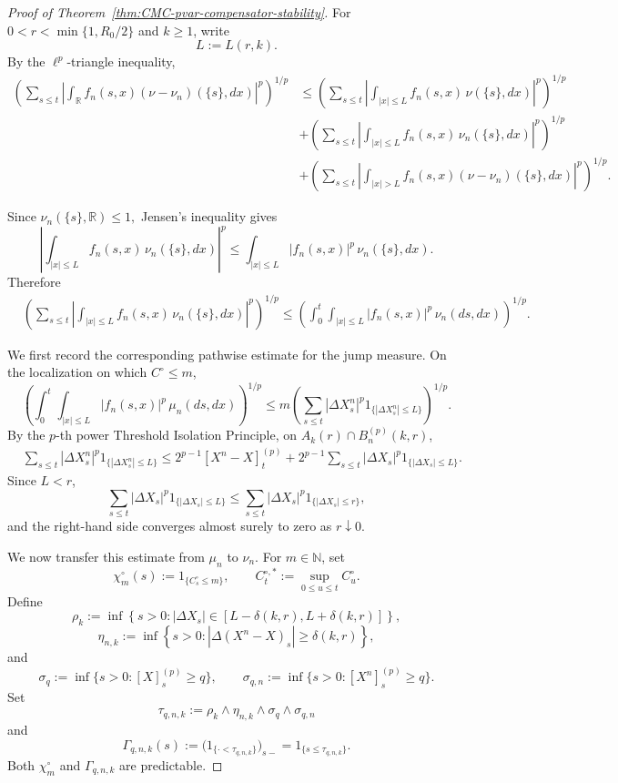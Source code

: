 \documentclass[a4paper,10pt]{article}
\begin{document}
\begin{proof}[Proof of Theorem~\ref{thm:CMC-pvar-compensator-stability}]
For \(0<r<\min\{1,R_0/2\}\) and \(k\ge1\), write
\[
        L:=L(r,k).
\]
By the \(\ell^p\)-triangle inequality,
\begin{align}
\left(
\sum_{s\le t}
\left|
\int_{\mathbb R}
f_n(s,x)(\nu-\nu_n)(\{s\},dx)
\right|^p
\right)^{1/p}
&\le
\left(
\sum_{s\le t}
\left|
\int_{|x|\le L}
f_n(s,x)\,\nu(\{s\},dx)
\right|^p
\right)^{1/p}
\nonumber\\
&+
\left(
\sum_{s\le t}
\left|
\int_{|x|\le L}
f_n(s,x)\,\nu_n(\{s\},dx)
\right|^p
\right)^{1/p}
\nonumber\\
&+
\left(
\sum_{s\le t}
\left|
\int_{|x|>L}
f_n(s,x)(\nu-\nu_n)(\{s\},dx)
\right|^p
\right)^{1/p}.
\label{eq:pvar-small-large-split}
\end{align}

Since
$
        \nu_n(\{s\},\mathbb R)\le1,
$
Jensen's inequality gives
\[
\left|
\int_{|x|\le L}
f_n(s,x)\,\nu_n(\{s\},dx)
\right|^p
\le
\int_{|x|\le L}
|f_n(s,x)|^p\,\nu_n(\{s\},dx).
\]
Therefore
\begin{align}
&\left(
\sum_{s\le t}
\left|
\int_{|x|\le L}
f_n(s,x)\,\nu_n(\{s\},dx)
\right|^p
\right)^{1/p}
\le
\left(
\int_0^t
\int_{|x|\le L}
|f_n(s,x)|^p\,\nu_n(ds,dx)
\right)^{1/p}.
\label{eq:pvar-small-compensator-Jensen}
\end{align}

We first record the corresponding pathwise estimate for the jump
measure. On the localization on which \(C^\circ\le m\),
\[
\left(
\int_0^t
\int_{|x|\le L}
|f_n(s,x)|^p\,\mu_n(ds,dx)
\right)^{1/p}
\le
m
\left(
\sum_{s\le t}
|\Delta X_s^n|^p
1_{\{|\Delta X_s^n|\le L\}}
\right)^{1/p}.
\]
By the \(p\)-th power Threshold Isolation Principle, on
\(A_k(r)\cap B_n^{(p)}(k,r)\),
\begin{align}
&\sum_{s\le t}
|\Delta X_s^n|^p
1_{\{|\Delta X_s^n|\le L\}}
\le
2^{p-1}[X^n-X]^{(p)}_t
+
2^{p-1}
\sum_{s\le t}
|\Delta X_s|^p
1_{\{|\Delta X_s|\le L\}}.
\label{eq:pvar-threshold-small-jump-bound}
\end{align}
Since \(L<r\),
\[
\sum_{s\le t}
|\Delta X_s|^p
1_{\{|\Delta X_s|\le L\}}
\le
\sum_{s\le t}
|\Delta X_s|^p
1_{\{|\Delta X_s|\le r\}},
\]
and the right-hand side converges almost surely to zero as
\(r\downarrow0\).

We now transfer this estimate from \(\mu_n\) to \(\nu_n\). For
\(m\in\mathbb N\), set
\[
        \chi_m^\circ(s):=1_{\{C^\circ_s\le m\}},
        \qquad
        C_t^{\circ,*}:=\sup_{0\le u\le t}C^\circ_u.
\]
Define
\[
\rho_k
:=
\inf\left\{
s>0:
|\Delta X_s|
\in[L-\delta(k,r),L+\delta(k,r)]
\right\},
\]
\[
\eta_{n,k}
:=
\inf\left\{
s>0:
|\Delta(X^n-X)_s|\ge\delta(k,r)
\right\},
\]
and
\[
\sigma_q
:=
\inf\{s>0:[X]^{(p)}_s\ge q\},
\qquad
\sigma_{q,n}
:=
\inf\{s>0:[X^n]^{(p)}_s\ge q\}.
\]
Set
\[
\tau_{q,n,k}
:=
\rho_k\wedge\eta_{n,k}\wedge\sigma_q\wedge\sigma_{q,n}
\]
and
\[
\Gamma_{q,n,k}(s)
:=
\bigl(1_{\{\cdot<\tau_{q,n,k}\}}\bigr)_{s-}
=
1_{\{s\le\tau_{q,n,k}\}}.
\]
Both \(\chi_m^\circ\) and \(\Gamma_{q,n,k}\) are predictable.


\end{proof}
\end{document}
